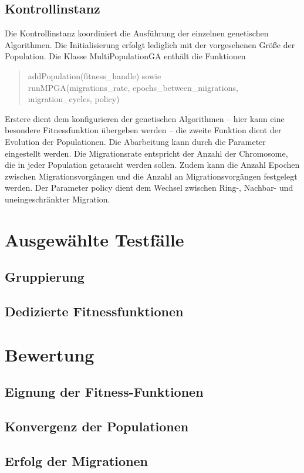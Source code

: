 \documentclass[12pt,a4paper]{article}
\begin{document}
\subsection{Kontrollinstanz}
Die Kontrollinstanz koordiniert die Ausführung der einzelnen genetischen Algorithmen. Die Initialisierung erfolgt lediglich mit der vorgesehenen Größe der Population. Die Klasse \textsf{MultiPopulationGA} enthält die Funktionen
\begin{quote}
\textsf{addPopulation(fitness\_handle)} sowie \\
\textsf{runMPGA(migrations\_rate, epochs\_between\_migrations, migration\_cycles, policy)}
\end{quote}
Erstere dient dem konfigurieren der genetischen Algorithmen -- hier kann eine besondere Fitnessfunktion übergeben werden -- die zweite Funktion dient der Evolution der Populationen. Die Abarbeitung kann durch die Parameter eingestellt werden. Die Migrationsrate entspricht der Anzahl der Chromosome, die in jeder Population getauscht werden sollen. Zudem kann die Anzahl Epochen zwischen Migrationsvorgängen und die Anzahl an Migrationsvorgängen festgelegt werden. Der Parameter \textsf{policy} dient dem Wechsel zwischen Ring-, Nachbar- und uneingeschränkter Migration.

\section{Ausgewählte Testfälle}
\subsection{Gruppierung}
\subsection{Dedizierte Fitnessfunktionen}

\section{Bewertung}
\subsection{Eignung der Fitness-Funktionen}
\subsection{Konvergenz der Populationen}
\subsection{Erfolg der Migrationen}
\end{document}
